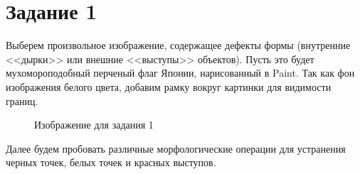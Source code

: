 \documentclass[a4paper, 12pt]{article}
\begin{document}
    \section{Задание 1}
    Выберем произвольное изображение, содержащее дефекты формы (внутренние <<дырки>> или внешние <<выступы>> объектов).
    Пусть это будет мухомороподобный перченый флаг Японии, нарисованный в Paint. Так как фон изображения белого цвета,
    добавим рамку вокруг картинки для видимости границ.
    \begin{figure}[H]
        \centering
        \captionsetup{skip=0pt}
        \caption{Изображение для задания 1}
        \label{fig:izt1}
    \end{figure}
    Далее будем пробовать различные морфологические операции для устранения черных точек, белых точек и красных выступов.
\end{document}
